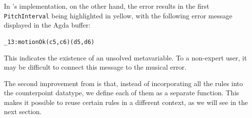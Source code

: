 \noindent In \citet{cong-cp}'s implementation, on the other hand,
the error results in the first \texttt{PitchInterval} being
highlighted in yellow, with the following error message displayed
in the Agda buffer:

\begin{alltt}
\_13 : motionOk (c 5 , c 6) (d 5 , d 6)
\end{alltt}

\noindent This indicates the existence of an unsolved metavariable.
To a non-expert user, it may be difficult to connect this message to
the musical error.

The second improvement from \citet{cong-cp} is that, instead of
incorporating all the rules into the counterpoint datatype, we define
each of them as a separate function.
This makes it possible to reuse certain rules in a different context,
as we will see in the next section.